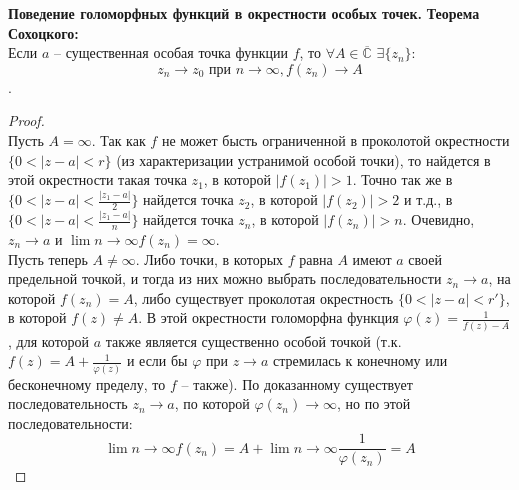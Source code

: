 \textbf{Поведение голоморфных функций в окрестности особых точек.}
\textbf{Теорема Сохоцкого:}\\
Если $a$ -- существенная особая точка функции $f$, то $\forall A \in \overline{\mathbb{C}}$ $\exists \{z_n\}:$ 
$$z_n \rightarrow z_0 \text{ при } n \rightarrow \infty, f(z_n) \rightarrow A$$.\\[2mm]

\begin{proof}
    \ \\
    Пусть $A=\infty$. Так как $f$ не может бысть ограниченной в проколотой окрестности $\{0<|z-a|<r\}$ (из характеризации устранимой особой точки), то найдется в этой окрестности такая точка $z_1$, в которой $|f(z_1)|>1$. Точно так же в $\{0<|z-a|<\frac{|z_1-a|}{2}\}$ найдется точка $z_2$, в которой $|f(z_2)|>2$ и т.д., в $\{0<|z-a|<\frac{|z_1-a|}{n}\}$ найдется точка $z_n$, в которой $|f(z_n)|>n$. Очевидно, $z_n \to a$ и $\lim\limits{n\to\infty} f(z_n)=\infty$.\\[2mm]
    Пусть теперь $A\neq \infty$. Либо точки, в которых $f$ равна $A$ имеют $a$ своей предельной точкой, и тогда из них можно выбрать последовательности $z_n \to a$, на которой $f(z_n)=A$, либо существует проколотая окрестность $\{0<|z-a|<r'\}$, в которой $f(z)\neq A$. В этой окрестности голоморфна функция $\varphi(z)=\frac{1}{f(z)-A}$, для которой $a$ также является существенно особой точкой (т.к. $f(z)=A+\frac{1}{\varphi(z)}$ и если бы $\varphi$ при $z\to a$ стремилась к конечному или бесконечному пределу, то $f$ -- также). По доказанному существует последовательность $z_n\to a$, по которой $\varphi(z_n)\to \infty$, но по этой последовательности:
    $$\lim\limits{n\to \infty}f(z_n)=A+\lim\limits{n\to\infty}\frac{1}{\varphi(z_n)}=A$$
\end{proof}
